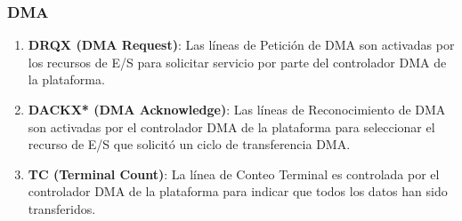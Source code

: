 \documentclass[12pt]{article}
\begin{document}
	\subsubsection*{DMA}
	\begin{enumerate}
		\item \textbf{DRQX (DMA Request)}: Las líneas de Petición de DMA son activadas por los recursos de E/S para solicitar servicio por parte del controlador DMA de la plataforma.
		
		\item \textbf{DACKX* (DMA Acknowledge)}: Las líneas de Reconocimiento de DMA son activadas por el controlador DMA de la plataforma para seleccionar el recurso de E/S que solicitó un ciclo de transferencia DMA.
		
		\item \textbf{TC (Terminal Count)}: La línea de Conteo Terminal es controlada por el controlador DMA de la plataforma para indicar que todos los datos han sido transferidos.
	\end{enumerate}
	
\end{document}
